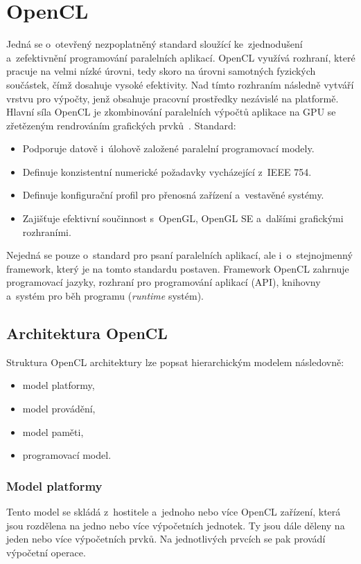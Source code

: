 \section{OpenCL}
Jedná se o~otevřený nezpoplatněný standard sloužící ke~zjednodušení a~zefektivnění programování
paralelních aplikací. OpenCL využívá rozhraní, které pracuje na velmi nízké úrovni, tedy skoro na
úrovni samotných fyzických součástek, čímž dosahuje vysoké efektivity. Nad tímto rozhraním následně
vytváří vrstvu pro výpočty, jenž obsahuje pracovní prostředky nezávislé na platformě. Hlavní síla
OpenCL je zkombinování paralelních výpočtů aplikace na GPU se zřetězeným rendrováním grafických
prvků~\cite{Khronos:2015}.
Standard:
\begin{itemize}
    \item Podporuje datově i~úlohově založené paralelní programovací modely.
    \item Definuje konzistentní numerické požadavky vycházející z~IEEE 754.
    \item Definuje konfigurační profil pro přenosná zařízení a~vestavěné systémy.
    \item Zajišťuje efektivní součinnost s~OpenGL, OpenGL SE a~dalšími grafickými
        rozhraními.
\end{itemize}
Nejedná se pouze o~standard pro psaní paralelních aplikací, ale i~o~stejnojmenný framework, který
je na tomto standardu postaven. Framework OpenCL zahrnuje programovací jazyky, rozhraní pro
programování aplikací (API), knihovny a~systém pro běh programu ({\it runtime} systém).
\subsection{Architektura OpenCL}
Struktura OpenCL architektury lze popsat hierarchickým modelem následovně:
\begin{itemize}
    \item model platformy,
    \item model provádění,
    \item model paměti,
    \item programovací model.
\end{itemize}

\subsubsection{Model platformy}
Tento model se skládá z~hostitele a~jednoho nebo více OpenCL zařízení, která jsou rozdělena na
jedno nebo více výpočetních jednotek. Ty jsou dále děleny na jeden nebo více výpočetních prvků.
Na jednotlivých prvcích se pak provádí výpočetní operace.

